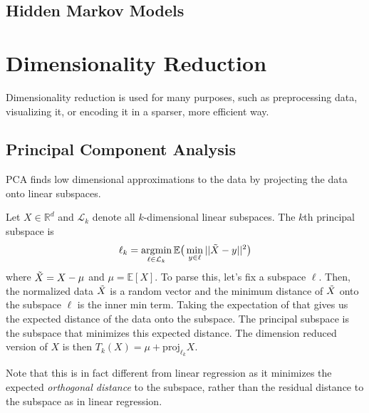 \documentclass{article}
\DeclareMathOperator*{\argmin}{\arg\!\min}
\begin{document}
  \subsection{Hidden Markov Models}

\section{Dimensionality Reduction} 

  Dimensionality reduction is used for many purposes, such as preprocessing data, visualizing it, or encoding it in a sparser, more efficient way. 

  \subsection{Principal Component Analysis} 
    
    PCA finds low dimensional approximations to the data by projecting the data onto linear subspaces. 

    \begin{definition}
      Let $X \in \mathbb{R}^d$ and $\mathcal{L}_k$ denote all $k$-dimensional linear subspaces. The $k$th principal subspace is 
      \begin{equation}
        \ell_k = \argmin_{\ell \in \mathcal{L}_k} \mathbb{E} \big( \min_{y \in \ell} ||\Tilde{X} - y||^2 \big)
      \end{equation}
      where $\Tilde{X} = X - \mu$ and $\mu = \mathbb{E}[X]$. To parse this, let's fix a subspace $\ell$. Then, the normalized data $\Tilde{X}$ is a random vector and the minimum distance of $\Tilde{X}$ onto the subspace $\ell$ is the inner min term. Taking the expectation of that gives us the expected distance of the data onto the subspace. The principal subspace is the subspace that minimizes this expected distance. The dimension reduced version of $X$ is then $T_k (X) = \mu + \mathrm{proj}_{\ell_k} X$. 
    \end{definition}

    Note that this is in fact different from linear regression as it minimizes the expected \textit{orthogonal distance} to the subspace, rather than the residual distance to the subspace as in linear regression. 
\end{document}
